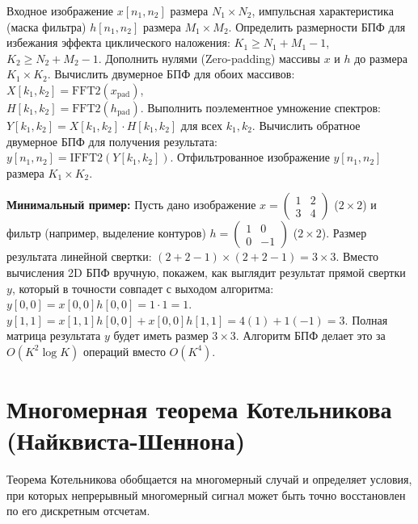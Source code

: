 \documentclass[12pt,a4paper]{article}
\begin{document}
\begin{algorithm}[H]
\caption{Алгоритм двумерной быстрой фильтрации на основе БПФ}
\begin{algorithmic}[1]
\REQUIRE Входное изображение $x[n_1, n_2]$ размера $N_1 \times N_2$, импульсная характеристика (маска фильтра) $h[n_1, n_2]$ размера $M_1 \times M_2$.
\STATE Определить размерности БПФ для избежания эффекта циклического наложения: $K_1 \ge N_1 + M_1 - 1$, $K_2 \ge N_2 + M_2 - 1$.
\STATE Дополнить нулями (Zero-padding) массивы $x$ и $h$ до размера $K_1 \times K_2$.
\STATE Вычислить двумерное БПФ для обоих массивов: \\
$X[k_1, k_2] = \text{FFT2}(x_{\text{pad}})$, \\
$H[k_1, k_2] = \text{FFT2}(h_{\text{pad}})$.
\STATE Выполнить поэлементное умножение спектров: \\
$Y[k_1, k_2] = X[k_1, k_2] \cdot H[k_1, k_2]$ для всех $k_1, k_2$.
\STATE Вычислить обратное двумерное БПФ для получения результата: \\
$y[n_1, n_2] = \text{IFFT2}(Y[k_1, k_2])$.
\RETURN Отфильтрованное изображение $y[n_1, n_2]$ размера $K_1 \times K_2$.
\end{algorithmic}
\end{algorithm}

\textbf{Минимальный пример:}
Пусть дано изображение $x = \begin{pmatrix} 1 & 2 \\ 3 & 4 \end{pmatrix}$ ($2\times2$) и фильтр (например, выделение контуров) $h = \begin{pmatrix} 1 & 0 \\ 0 & -1 \end{pmatrix}$ ($2\times2$).
Размер результата линейной свертки: $(2+2-1) \times (2+2-1) = 3 \times 3$.
Вместо вычисления 2D БПФ вручную, покажем, как выглядит результат прямой свертки $y$, который в точности совпадет с выходом алгоритма:
$y[0,0] = x[0,0]h[0,0] = 1 \cdot 1 = 1$.
$y[1,1] = x[1,1]h[0,0] + x[0,0]h[1,1] = 4(1) + 1(-1) = 3$.
Полная матрица результата $y$ будет иметь размер $3\times3$. Алгоритм БПФ делает это за $O(K^2 \log K)$ операций вместо $O(K^4)$.

\section{Многомерная теорема Котельникова (Найквиста-Шеннона)}

Теорема Котельникова обобщается на многомерный случай и определяет условия, при которых непрерывный многомерный сигнал может быть точно восстановлен по его дискретным отсчетам.
\end{document}
